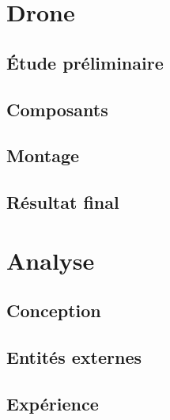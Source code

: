 \documentclass{beamer}
\begin{document}
  {
    \section{Drone}
    
      \subsection{Étude préliminaire}
	\begin{frame}
	  
	\end{frame}
      
      \subsection{Composants}
	\begin{frame}
	 
	\end{frame}

      
      \subsection{Montage}
	\begin{frame}
	 
	\end{frame}

      
      \subsection{Résultat final}
	\begin{frame}
	 
	\end{frame}


  }
  
  {
    \section{Analyse}
    
      \subsection{Conception}
	\begin{frame}
	 
	\end{frame}
	
      \subsection{Entités externes}
	\begin{frame}
	 
	\end{frame}
	
      \subsection{Expérience}
	\begin{frame}
	  
	\end{frame}
  }
  
\end{document}
